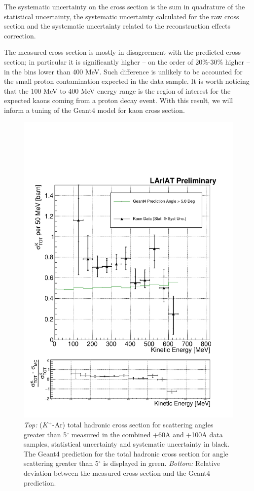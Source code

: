 The systematic uncertainty on the cross section is the sum in quadrature of the statistical uncertainty, the systematic uncertainty calculated for the raw cross section and the systematic uncertainty related to the reconstruction  effects  correction.

The measured cross section is mostly in disagreement with the predicted cross section; in particular it is significantly higher -- on the order of 20\%-30\% higher -- in the bins lower than 400 MeV. Such difference is unlikely to be accounted for the small proton contamination expected in the data sample. It is worth noticing that the 100 MeV to 400 MeV energy range is the region of interest for the expected kaons coming from a proton decay event. With this result, we will inform a tuning of the Geant4 model for kaon cross section.

\begin{figure}[htb]
\centering
\includegraphics[width=\textwidth]{Chapter-7/Images/TheMoneyPlotK.pdf}
\caption{ \emph{Top:} ($K^+$-Ar) total hadronic cross section for  scattering angles greater than 5$^\circ$ measured in the combined +60A and +100A data samples, statistical uncertainty and systematic uncertainty in black. The Geant4 prediction for the total hadronic cross section for angle scattering greater than 5$^\circ$ is displayed in green. \emph{Bottom:} Relative deviation between the measured cross section and the Geant4 prediction.} 
\label{fig:FinalXSKaon}
\end{figure}


